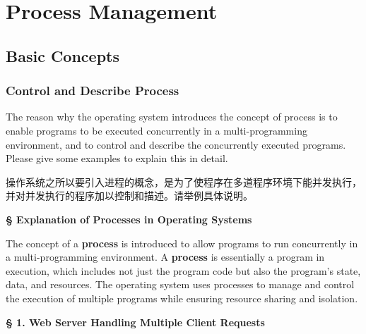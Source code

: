 \documentclass[a4paper]{book}
\newcommand{\sfbf}[1]{{\normalsize\textsf{\textbf{§ #1}}}}
\begin{document}
\chapter{Process Management}

\section{Basic Concepts}

\subsection{Control and Describe Process}

\begin{greenbox}
The reason why the operating system introduces the concept of process is to enable programs to be executed concurrently in a multi-programming environment, and to control and describe the concurrently executed programs. Please give some examples to explain this in detail.
\end{greenbox}

操作系统之所以要引入进程的概念，是为了使程序在多道程序环境下能并发执行，并对并发执行的程序加以控制和描述。请举例具体说明。 

\sfbf{Explanation of Processes in Operating Systems}

The concept of a \textbf{process} is introduced to allow programs to run concurrently in a multi-programming environment. A \textbf{process} is essentially a program in execution, which includes not just the program code but also the program's state, data, and resources. The operating system uses processes to manage and control the execution of multiple programs while ensuring resource sharing and isolation.

\hrulefill

\sfbf{1. Web Server Handling Multiple Client Requests}
\end{document}
